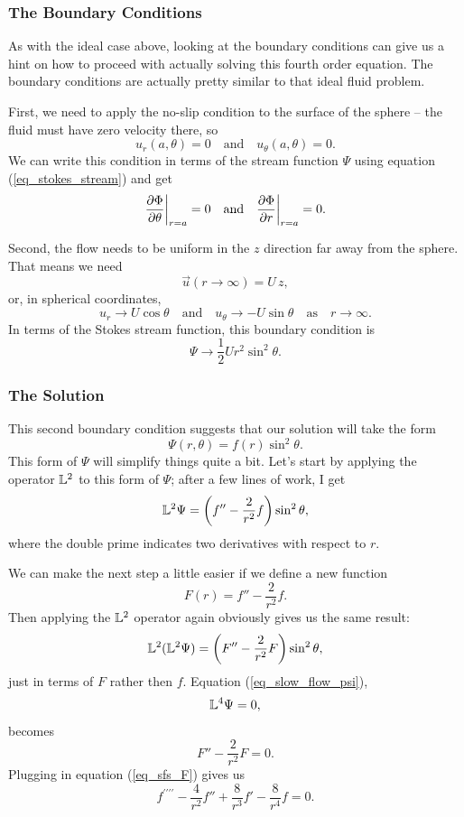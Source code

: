 \subsubsection{The Boundary Conditions}

As with the ideal case above, looking at the boundary conditions can give us a hint on how to proceed with actually solving this fourth order equation.  The boundary conditions are actually pretty similar to that ideal fluid problem.

First, we need to apply the no-slip condition to the surface of the sphere -- the fluid must have zero velocity there, so
\[
u_r(a, \theta) = 0 \quad \text{and} \quad u_\theta(a, \theta) = 0.
\]
We can write this condition in terms of the stream function $\Psi$ using equation (\ref{eq_stokes_stream}) and get
\begin{equation}
\label{eq_slow_bc1}
\frac{\partial {\Phi}}{\partial {\theta}} \bigg|_{r=a} = 0 \quad \text{and} \quad \frac{\partial {\Phi}}{\partial {r}} \bigg|_{r=a} = 0.
\end{equation}

Second, the flow needs to be uniform in the $z$ direction far away from the sphere.  That means we need
\[
\vec{u}(r \to \infty) = U \, \unit{z},
\]
or, in spherical coordinates,
\[
u_r \to U\cos\theta \quad \text{and} \quad u_\theta \to  - U \sin\theta \quad \text{as} \quad r \to \infty.
\]
In terms of the Stokes stream function, this boundary condition is
\begin{equation}
\label{eq_slow_bc2}
\Psi \to \frac{1}{2} U r^2 \sin^2 \theta.
\end{equation}

\subsubsection{The Solution}

This second boundary condition suggests that our solution will take the form
\begin{equation}
\Psi(r, \theta) = f(r) \sin^2\theta.
\end{equation}
This form of $\Psi$ will simplify things quite a bit.  Let's start by applying the operator $\mathbb{L}^2$ to this form of $\Psi$; after a few lines of work, I get
\[
\mathbb{L}^2 \Psi = \left( f'' - \frac{2}{r^2} f \right) \sin^2\theta,
\]
where the double prime indicates two derivatives with respect to $r$.

We can make the next step a little easier if we define a new function 
\begin{equation}
\label{eq_sfs_F}
F(r) = f'' - \frac{2}{r^2} f.
\end{equation}
Then applying the $\mathbb{L}^2$ operator again obviously gives us the same result:
\[
\mathbb{L}^2 (\mathbb{L}^2 \Psi) =  \left( F'' - \frac{2}{r^2} F \right) \sin^2\theta,
\]
just in terms of $F$ rather then $f$.  Equation (\ref{eq_slow_flow_psi}),
\[
\mathbb{L}^4 \Psi = 0,
\]
becomes 
\[
F'' - \frac{2}{r^2} F = 0.
\]
Plugging in equation (\ref{eq_sfs_F}) gives us 
\begin{equation}
f^{\prime\prime\prime\prime} - \frac{4}{r^2} f'' + \frac{8}{r^3} f' - \frac{8}{r^4} f = 0.
\end{equation}


